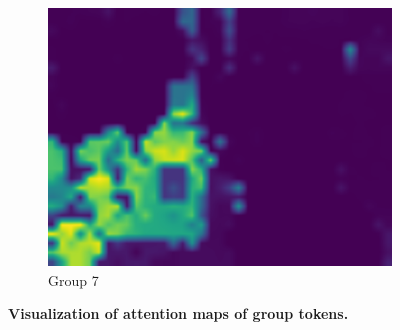 \begin{figure}[t]
\begin{subfigure}{0.19\textwidth}
    \includegraphics[width=\linewidth]{Images/all group tokens/10/attn_map7withouttitle.pdf}
    \caption{Group 7}
\end{subfigure}
\caption[\textbf{GroupViT: Visualization of Attention Maps of Group Tokens}]{\textbf{ Visualization of attention maps of group tokens.}}
\label{fig:groupattnmap}
\end{figure}


